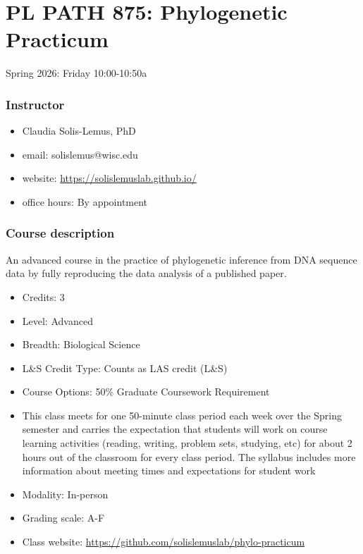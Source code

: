 \documentclass{article}
\begin{document}
\section*{PL PATH 875: Phylogenetic Practicum}

Spring 2026: Friday 10:00-10:50a

\subsubsection*{Instructor}
\begin{itemize}
    \item Claudia Solis-Lemus, PhD
    \item email: solislemus@wisc.edu
    \item website: \url{https://solislemuslab.github.io/}
    \item office hours: By appointment
\end{itemize}


\subsubsection*{Course description}

An advanced course in the practice of phylogenetic inference from DNA sequence data by fully reproducing the data analysis of a published paper.

\begin{itemize}
    \item Credits: 3
    \item Level: Advanced
    \item Breadth: Biological Science
    \item L\&S Credit Type: Counts as LAS credit (L\&S)
    \item Course Options: 50\% Graduate Coursework Requirement
    \item This class meets for one 50-minute class period each week over the Spring semester and carries the expectation that students will work on course learning activities (reading, writing, problem sets, studying, etc) for about 2 hours out of the classroom for every class period. The syllabus includes more information about meeting times and expectations for student work
    \item Modality: In-person
    \item Grading scale: A-F
    \item Class website: \url{https://github.com/solislemuslab/phylo-practicum}
\end{itemize}
\end{document}
